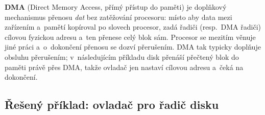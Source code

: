 \begin{poznamka}
\textbf{DMA} (Direct Memory Access, přímý přístup do paměti) je doplňkový mechanismus přenosu \emph{dat} bez zatěžování procesoru: místo aby data mezi zařízením a~pamětí kopíroval po slovech procesor, zadá řadiči (resp.\ DMA řadiči) cílovou fyzickou adresu a~ten přenese celý blok sám. Procesor se mezitím věnuje jiné práci a~o~dokončení přenosu se dozví přerušením. DMA tak typicky doplňuje obsluhu přerušením; v~následujícím příkladu disk přenáší přečtený blok do paměti právě přes DMA, takže ovladač jen nastaví cílovou adresu a~čeká na dokončení.
\end{poznamka}

\subsection{Řešený příklad: ovladač pro řadič disku}

